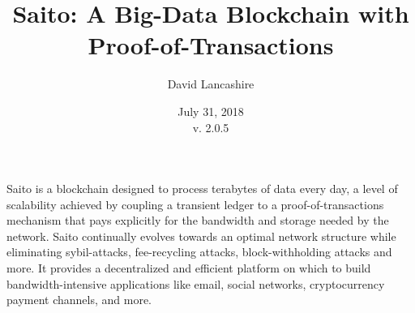 \documentclass[11.5pt, oneside]{article}   	%
\title{Saito: A Big-Data Blockchain with Proof-of-Transactions}
\author{David Lancashire}
\date{July 31, 2018\\v. 2.0.5}
\begin{document}
\maketitle

\begin{onecolabstract}
Saito is a blockchain designed to process terabytes of data every day, a level of scalability achieved by coupling a transient ledger to a proof-of-transactions mechanism that pays explicitly for the bandwidth and storage needed by the network. Saito continually evolves towards an optimal network structure while eliminating sybil-attacks, fee-recycling attacks, block-withholding attacks and more. It provides a decentralized and efficient platform on which to build bandwidth-intensive applications like email, social networks, cryptocurrency payment channels, and more.
\end{onecolabstract}
\end{document}
